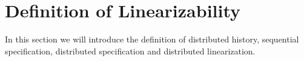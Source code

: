 

\section{Definition of Linearizability}
\label{sec:definition of linearizability}


In this section we will introduce the definition of distributed history, sequential specification, distributed specification and distributed linearization. 


